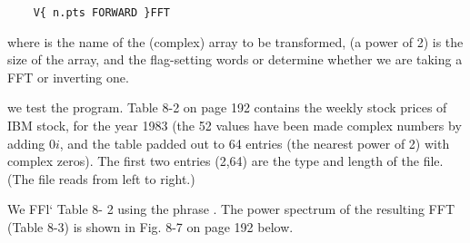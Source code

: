 \begin{lstlisting}
    V{ n.pts FORWARD }FFT
\end{lstlisting}

where  is the name of the (complex) array to be transformed,  (a power of 2) is the size of the array, and the flag-setting words  or  determine whether we are taking a FFT or inverting one.

 we test the program. Table 8-2 on page 192 contains the weekly stock prices of IBM stock, for the year 1983 (the 52 values have been made complex numbers by adding $0i$, and the table padded out to 64 entries (the nearest power of 2) with complex zeros). The first two entries (2,64) are the type and length of the file. (The file reads from left to right.)

We FFl‘ Table 8- 2 using the phrase . The power spectrum of the resulting FFT (Table 8-3) is shown in Fig. 8-7 on page 192 below.

